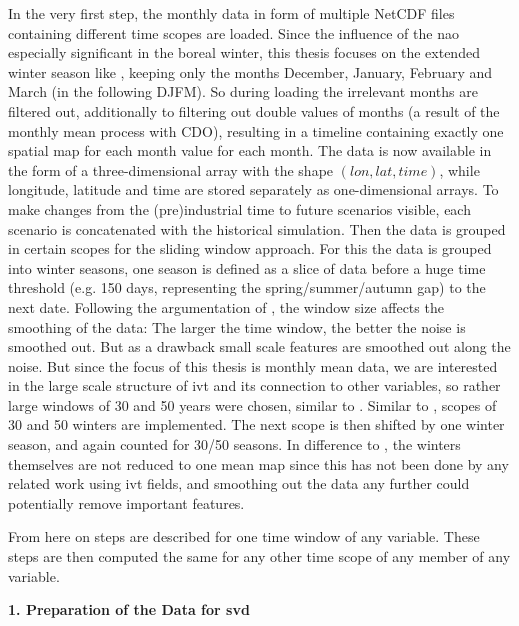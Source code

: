 In the very first step, the monthly data in form of multiple NetCDF files containing different time scopes are loaded. 
Since the influence of the \ac{nao} especially significant in the boreal winter, this thesis focuses on the extended winter season like \cite{vietinghoff_visual_2021}, keeping only the months December, January, February and March (in the following DJFM). 
So during loading the irrelevant months are filtered out, additionally to filtering out double values of months (a result of the monthly mean process with CDO), resulting in a timeline containing exactly one spatial map for each month value for each month. 
The data is now available in the form of a three-dimensional array with the shape $(lon, lat, time)$, while longitude, latitude and time are stored separately as one-dimensional arrays. 
To make changes from the (pre)industrial time to future scenarios visible, each scenario is concatenated with the historical simulation. 
Then the data is grouped in certain scopes for the sliding window approach. 
For this the data is grouped into winter seasons, one season is defined as a slice of data before a huge time threshold (e.g. 150 days, representing the spring/summer/autumn gap) to the next date. 
Following the argumentation of , the window size affects the smoothing of the data: The larger the time window, the better the noise is smoothed out.
But as a drawback small scale features are smoothed out along the noise. 
But since the focus of this thesis is monthly mean data, we are interested in the large scale structure of \ac{ivt} and its connection to other variables, so rather large windows of 30 and 50 years were chosen, similar to .  
Similar to \citeauthor{vietinghoff_visual_2021}, scopes of 30 and 50 winters are implemented.  
The next scope is then shifted by one winter season, and again counted for 30/50 seasons. 
In difference to \cite{vietinghoff_visual_2021}, the winters themselves are not reduced to one mean map since this has not been done by any related work using \ac{ivt} fields, and smoothing out the data any further could potentially remove important features. 


From here on steps are described for one time window of any variable. 
These steps are then computed the same for any other time scope of any member of any variable. 



\textbf{1. Preparation of the Data for \ac{svd}}

